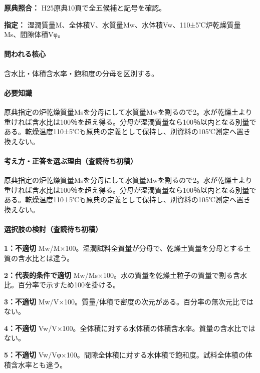 \noindent\textbf{原典照合：} H25原典10頁で全五候補と記号を確認。\par

\noindent\textbf{指定：} 湿潤質量M、全体積V、水質量Mw、水体積Vw、110±5℃炉乾燥質量Ms、間隙体積Vφ。\par

\paragraph{問われる核心} 含水比・体積含水率・飽和度の分母を区別する。

\paragraph{必要知識} 原典指定の炉乾燥質量Msを分母にして水質量Mwを割るので2。水が乾燥土より重ければ含水比は100％を超え得る。分母が湿潤質量なら100％以内となる別量である。乾燥温度110±5℃も原典の定義として保持し、別資料の105℃測定へ置き換えない。

\paragraph{考え方・正答を選ぶ理由（査読待ち初稿）} 原典指定の炉乾燥質量Msを分母にして水質量Mwを割るので2。水が乾燥土より重ければ含水比は100％を超え得る。分母が湿潤質量なら100％以内となる別量である。乾燥温度110±5℃も原典の定義として保持し、別資料の105℃測定へ置き換えない。

\paragraph{選択肢の検討（査読待ち初稿）}\mbox{}\par

\noindent\textbf{1：不適切} Mw/M×100。湿潤試料全質量が分母で、乾燥土質量を分母とする土質の含水比とは違う。\par

\noindent\textbf{2：代表的条件で適切} Mw/Ms×100。水の質量を乾燥土粒子の質量で割る含水比。百分率で示すため100を掛ける。\par

\noindent\textbf{3：不適切} Mw/V×100。質量/体積で密度の次元がある。百分率の無次元比ではない。\par

\noindent\textbf{4：不適切} Vw/V×100。全体積に対する水体積の体積含水率。質量の含水比ではない。\par

\noindent\textbf{5：不適切} Vw/Vφ×100。間隙全体積に対する水体積で飽和度。試料全体積の体積含水率とも違う。\par

